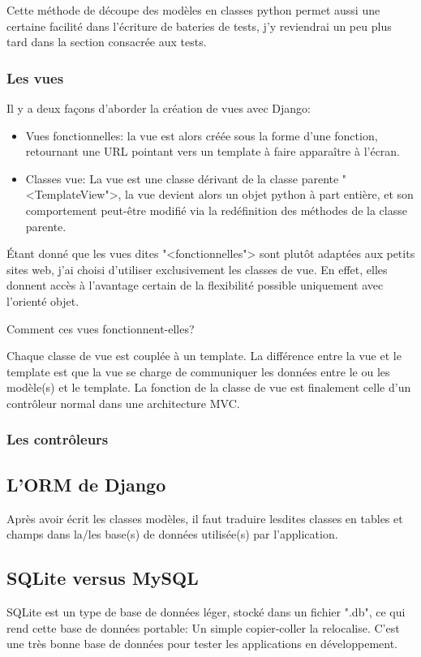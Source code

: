 \documentclass[12pt,table,a4paper]{report}
\begin{document}
Cette méthode de découpe des modèles en classes python permet aussi une certaine facilité dans l'écriture de bateries de tests, j'y reviendrai un peu plus tard dans la section consacrée aux tests.

\subsubsection{Les vues}
Il y a deux façons d'aborder la création de vues avec Django:

\begin{itemize}
	\item{Vues fonctionnelles: la vue est alors créée sous la forme d'une fonction, retournant une URL pointant vers un template à faire apparaître à l'écran.}
	\item{Classes vue: La vue est une classe dérivant de la classe parente "<TemplateView">, la vue devient alors un objet python à part entière, et son comportement peut-être modifié via la redéfinition des méthodes de la classe parente.}
\end{itemize}

Étant donné que les vues dites "<fonctionnelles"> sont plutôt adaptées aux petits sites web, j'ai choisi d'utiliser exclusivement les classes de vue. En effet, elles donnent accès à l'avantage certain de la flexibilité possible uniquement avec l'orienté objet.

Comment ces vues fonctionnent-elles?

Chaque classe de vue est couplée à un template. La différence entre la vue et le template est que la vue se charge de communiquer les données entre le ou les modèle(s) et le template. La fonction de la classe de vue est finalement celle d'un contrôleur normal dans une architecture MVC.


\subsubsection{Les contrôleurs}

\subsection{L'ORM de Django}
Après avoir écrit les classes modèles, il faut traduire lesdites classes en tables et champs dans la/les base(s) de données utilisée(s) par l'application.

\subsection{SQLite versus MySQL}
SQLite est un type de base de données léger, stocké dans un fichier ".db", ce qui rend cette base de données portable: Un simple copier-coller la relocalise. C'est une très bonne base de données pour tester les applications en développement.
\end{document}
